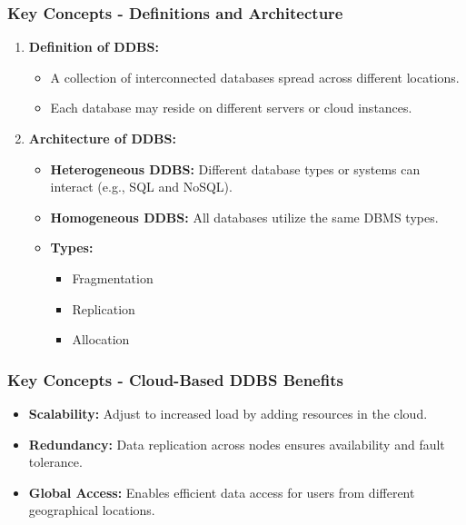 \documentclass[aspectratio=169]{beamer}
\begin{document}
\begin{frame}
    \frametitle{Key Concepts - Definitions and Architecture}
    \begin{enumerate}
        \item \textbf{Definition of DDBS:}
        \begin{itemize}
            \item A collection of interconnected databases spread across different locations.
            \item Each database may reside on different servers or cloud instances.
        \end{itemize}
        
        \item \textbf{Architecture of DDBS:}
        \begin{itemize}
            \item \textbf{Heterogeneous DDBS:} Different database types or systems can interact (e.g., SQL and NoSQL).
            \item \textbf{Homogeneous DDBS:} All databases utilize the same DBMS types.
            \item \textbf{Types:}
            \begin{itemize}
                \item Fragmentation
                \item Replication
                \item Allocation
            \end{itemize}
        \end{itemize}
    \end{enumerate}
\end{frame}

\begin{frame}
    \frametitle{Key Concepts - Cloud-Based DDBS Benefits}
    \begin{itemize}
        \item \textbf{Scalability:} Adjust to increased load by adding resources in the cloud.
        \item \textbf{Redundancy:} Data replication across nodes ensures availability and fault tolerance.
        \item \textbf{Global Access:} Enables efficient data access for users from different geographical locations.
    \end{itemize}
\end{frame}
\end{document}
